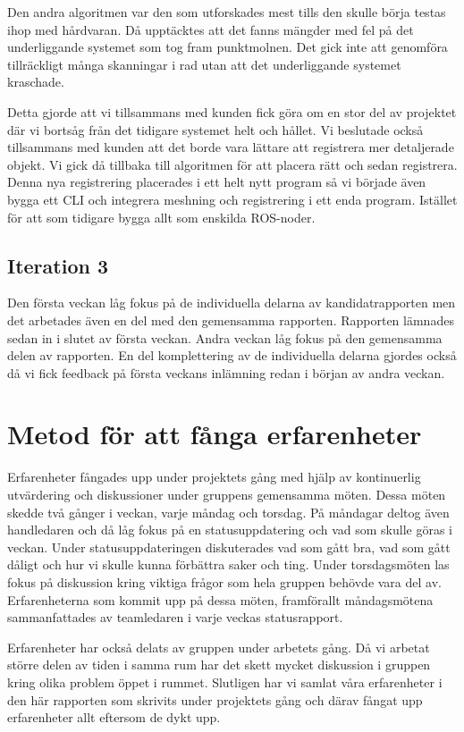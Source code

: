 Den andra algoritmen var den som utforskades mest tills den skulle börja testas ihop med hårdvaran. Då upptäcktes att det fanns mängder med fel på det underliggande systemet som tog fram punktmolnen. Det gick inte att genomföra tillräckligt många skanningar i rad utan att det underliggande systemet kraschade. 

Detta gjorde att vi tillsammans med kunden fick göra om en stor del av projektet där vi bortsåg från det tidigare systemet helt och hållet. Vi beslutade också tillsammans med kunden att det borde vara lättare att registrera mer detaljerade objekt. Vi gick då tillbaka till algoritmen för att placera rätt och sedan registrera. Denna nya registrering placerades i ett helt nytt program så vi började även bygga ett CLI och integrera meshning och registrering i ett enda program. Istället för att som tidigare bygga allt som enskilda ROS-noder.

\subsection{Iteration 3}

Den första veckan låg fokus på de individuella delarna av kandidatrapporten men det arbetades även en del med den gemensamma rapporten. Rapporten lämnades sedan in i slutet av första veckan. Andra veckan låg fokus på den gemensamma delen av rapporten. En del komplettering av de individuella delarna gjordes också då vi fick feedback på första veckans inlämning redan i början av andra veckan.


\section{Metod för att fånga erfarenheter}

Erfarenheter fångades upp under projektets gång med hjälp av kontinuerlig utvärdering och diskussioner under gruppens gemensamma möten. Dessa möten skedde två gånger i veckan, varje måndag och torsdag. På måndagar deltog även handledaren och då låg fokus på en statusuppdatering och vad som skulle göras i veckan. Under statusuppdateringen diskuterades vad som gått bra, vad som gått dåligt och hur vi skulle kunna förbättra saker och ting. Under torsdagsmöten las fokus på diskussion kring viktiga frågor som hela gruppen behövde vara del av. Erfarenheterna som kommit upp på dessa möten, framförallt måndagsmötena sammanfattades av teamledaren i varje veckas statusrapport.

Erfarenheter har också delats av gruppen under arbetets gång. Då vi arbetat större delen av tiden i samma rum har det skett mycket diskussion i gruppen kring olika problem öppet i rummet. Slutligen har vi samlat våra erfarenheter i den här rapporten som skrivits under projektets gång och därav fångat upp erfarenheter allt eftersom de dykt upp.


